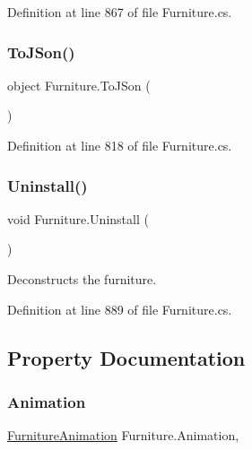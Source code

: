 Definition at line 867 of file Furniture.\+cs.

\mbox{\label{class_furniture_a70a11718cc06b20399767ac765ef52e7}} 
\subsubsection{\texorpdfstring{To\+J\+Son()}{ToJSon()}}
{\footnotesize\ttfamily object Furniture.\+To\+J\+Son (\begin{DoxyParamCaption}{ }\end{DoxyParamCaption})}



Definition at line 818 of file Furniture.\+cs.

\mbox{\label{class_furniture_ae369f8b64c986a029ffe7b9ecf5d3f30}} 
\subsubsection{\texorpdfstring{Uninstall()}{Uninstall()}}
{\footnotesize\ttfamily void Furniture.\+Uninstall (\begin{DoxyParamCaption}{ }\end{DoxyParamCaption})}



Deconstructs the furniture. 



Definition at line 889 of file Furniture.\+cs.



\subsection{Property Documentation}
\mbox{\label{class_furniture_a6c205a695d6f398f76df5c5c90ae170c}} 
\subsubsection{\texorpdfstring{Animation}{Animation}}
{\footnotesize\ttfamily \hyperlink{class_animation_1_1_furniture_animation}{Furniture\+Animation} Furniture.\+Animation\hspace{0.3cm}{\ttfamily [get]}, {\ttfamily [set]}}



